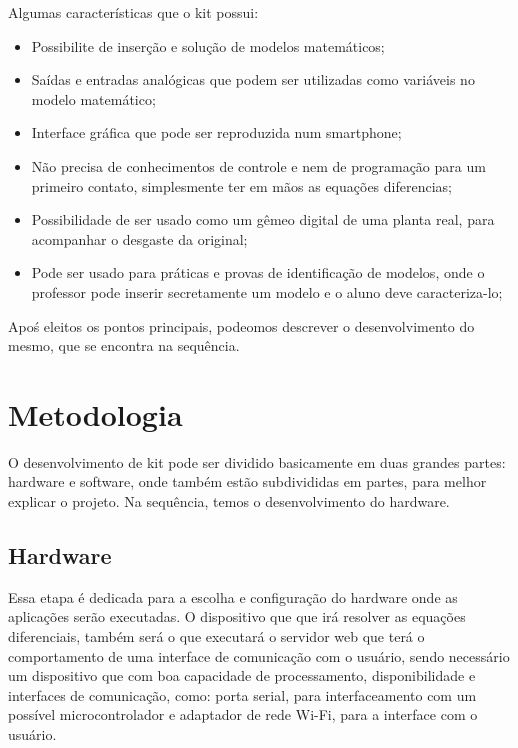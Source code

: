 \documentclass[journal]{IEEEtranTIE}
\begin{document}
Algumas características que o kit possui:

\begin{itemize}[]
	   \item Possibilite de inserção e solução de modelos matemáticos;
	   \item Saídas e entradas analógicas que podem ser utilizadas como variáveis no modelo matemático;
	   \item Interface gráfica que pode ser reproduzida num smartphone;
	   \item Não precisa de conhecimentos de controle e nem de programação para um primeiro contato, simplesmente ter em mãos as equações diferencias;
	   \item Possibilidade de ser usado como um gêmeo digital de uma planta real, para acompanhar o desgaste da original;
	   \item Pode ser usado para práticas e provas de identificação de modelos, onde o professor pode inserir secretamente um modelo e o aluno deve caracteriza-lo;
\end{itemize}

Apoś eleitos os pontos principais, podeomos descrever o desenvolvimento do mesmo, que se encontra na sequência.


\section{Metodologia}

O desenvolvimento de kit pode ser dividido basicamente em duas grandes partes: hardware e software, onde também estão subdivididas em partes, para melhor explicar o projeto. Na sequência, temos o desenvolvimento do hardware.

\subsection{Hardware}

Essa etapa é dedicada para a escolha e configuração do hardware onde as aplicações serão executadas. O dispositivo que que irá resolver as equações diferenciais, também será o que executará o servidor web que terá o comportamento de uma interface de comunicação com o usuário, sendo necessário um dispositivo que com boa capacidade de processamento, disponibilidade e interfaces de comunicação, como: porta serial, para interfaceamento com um possível microcontrolador e adaptador de rede Wi-Fi, para a interface com o usuário.
\end{document}
